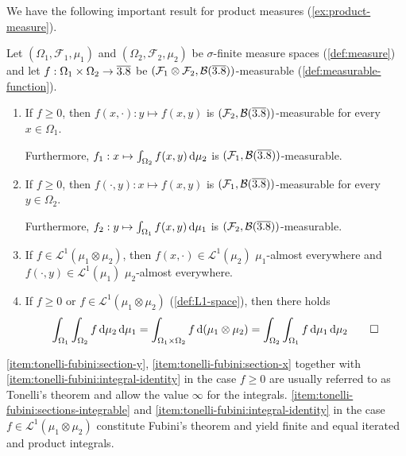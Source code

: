



We have the following important result for product measures (\autoref{ex:product-measure}).

\begin{fact}\label{fact:tonelli-fubini}
Let 
$(\Omega_1,\mathcal{F}_1,\mu_1)$ and $(\Omega_2,\mathcal{F}_2,\mu_2)$
be $\sigma$-finite measure spaces (\autoref{def:measure})
and let
$f : \Omega_1 \times \Omega_2 \to \overline{3.8}$ be $(\mathcal{F}_1 \otimes \mathcal{F}_2,\mathcal{B}(\overline{3.8}))$-measurable (\autoref{def:measurable-function}).
\begin{enumerate}[label=(\roman*)]
\item \label{item:tonelli-fubini:section-y}
If $f \geq 0$, then $f(x,\cdot) : y \mapsto f(x,y)$ is $(\mathcal{F}_2,\mathcal{B}(\overline{3.8}))$-measurable for every $x \in \Omega_1$.

Furthermore,
\(
f_1 : x \mapsto \int_{\Omega_2} f(x,y)\,\mathrm{d}\mu_2
\)
is $(\mathcal{F}_1,\mathcal{B}(\overline{3.8}))$-measurable.
\item \label{item:tonelli-fubini:section-x}
If $f \geq 0$, then $f(\cdot,y) : x \mapsto f(x,y)$ is $(\mathcal{F}_1,\mathcal{B}(\overline{3.8}))$-measurable for every $y \in \Omega_2$.

Furthermore,
\(
f_2 : y \mapsto \int_{\Omega_1} f(x,y)\,\mathrm{d}\mu_1
\)
is $(\mathcal{F}_2,\mathcal{B}(\overline{3.8}))$-measurable.
\item \label{item:tonelli-fubini:sections-integrable}
If $f \in \mathcal{L}^1(\mu_1 \otimes \mu_2)$, then $f(x,\cdot) \in \mathcal{L}^1(\mu_2)$ $\mu_1$-almost everywhere and $f(\cdot,y) \in \mathcal{L}^1(\mu_1)$ $\mu_2$-\allowbreak{}almost  everywhere.
\item \label{item:tonelli-fubini:integral-identity}
If $f \geq 0$ or $f \in \mathcal{L}^1(\mu_1 \otimes \mu_2)$ (\autoref{def:L1-space}), then there holds
\begin{equation}\label{eq:tonelli-fubini-integral-identity}
\int_{\Omega_1}\int_{\Omega_2} f\,\mathrm{d}\mu_2\,\mathrm{d}\mu_1
=
\int_{\Omega_1\times\Omega_2} f\,\mathrm{d}(\mu_1 \otimes \mu_2)
=
\int_{\Omega_2}\int_{\Omega_1} f\,\mathrm{d}\mu_1\,\mathrm{d}\mu_2
\qedhere
\end{equation}
\end{enumerate}
\end{fact}

\begin{remark}
\ref{item:tonelli-fubini:section-y}, \ref{item:tonelli-fubini:section-x} together with \ref{item:tonelli-fubini:integral-identity} in the case $f \geq 0$ are usually referred to as Tonelli's theorem and allow the value $\infty$ for the integrals.
\ref{item:tonelli-fubini:sections-integrable} and \ref{item:tonelli-fubini:integral-identity} in the case $f \in \mathcal{L}^1(\mu_1 \otimes \mu_2)$ constitute Fubini's theorem and yield finite and equal iterated and product integrals.
\end{remark}


